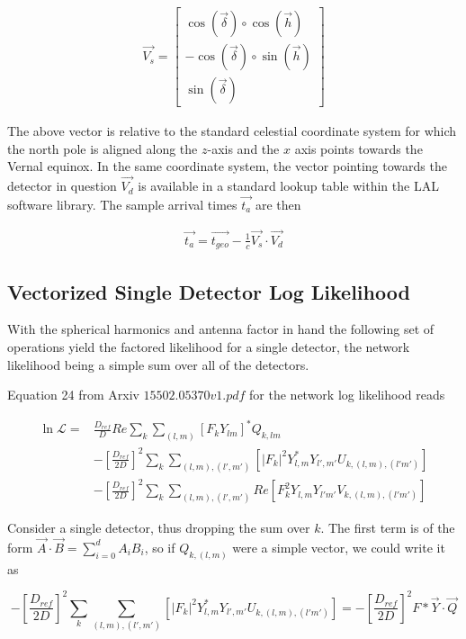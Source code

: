 \begin{align}
\vec{V_{s}} = 
\begin{bmatrix}
\cos(\vec{\delta}) \circ \cos(\vec{h}) \\
-\cos(\vec{\delta}) \circ \sin(\vec{h}) \\
\sin(\vec{\delta})
\end{bmatrix}
\end{align}

The above vector is relative to the standard celestial coordinate system for which the north pole is aligned along the $z$-axis and the $x$ axis points towards the Vernal equinox. In the same coordinate system, the vector pointing towards the detector in question $\vec{V_d}$ is available in a standard lookup table within the LAL software library. The sample arrival times $\vec{t_a}$ are then

\begin{align}
\vec{t_a} = \vec{t_{geo}} - \frac{1}{c}\vec{V_s} \cdot \vec{V_d}
\end{align}

\subsection{Vectorized Single Detector Log Likelihood}

With the spherical harmonics and antenna factor in hand the following set of operations yield the factored likelihood for a single detector, the network likelihood being a simple sum over all of the detectors.

Equation 24 from Arxiv $15502.05370v1.pdf$ for the network log likelihood reads 

\begin{align}
\ln{\mathcal{L}} = &\frac{D_{ref}}{D}Re \sum_{k}\sum_{(l,m)}\left[F_k Y_{lm}\right]^{*}Q_{k,lm} \\ 
& - \left[\frac{D_{ref}}{2D}\right]^{2}\sum_{k}\sum_{(l,m),(l',m')}\left[|F_k|^2 Y_{l,m}^{*}Y_{l',m'}U_{k,(l,m),(l'm')}\right] \\
 & - \left[\frac{D_{ref}}{2D}\right]^{2}\sum_{k}\sum_{(l,m),(l',m')}Re\left[  F_{k}^{2}Y_{l,m}Y_{l'm'}V_{k,(l,m),(l'm')}\right]
\end{align}

Consider a single detector, thus dropping the sum over $k$. The first term is of the form $\vec{A}\cdot\vec{B} = \sum_{i=0}^{d}A_iB_i$, so if $Q_{k,(l,m)}$ were a simple vector, we could write it as

\begin{equation}
- \left[\frac{D_{ref}}{2D}\right]^{2}\sum_{k}\sum_{(l,m),(l',m')}\left[|F_k|^2 Y_{l,m}^{*}Y_{l',m'}U_{k,(l,m),(l'm')}\right] = - \left[\frac{D_{ref}}{2D}\right]^{2} F*\vec{Y}\cdot\vec{Q}
\end{equation}

